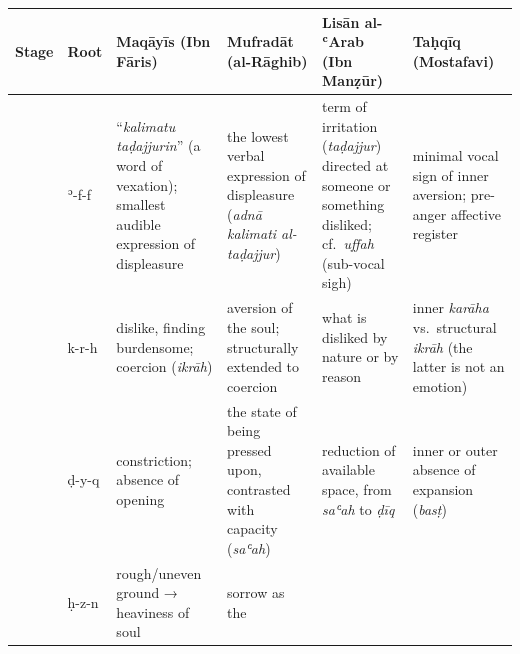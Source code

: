 \begin{longtable}[]{@{}
  >{\centering\arraybackslash}p{}
  >{\centering\arraybackslash}p{}
  >{\raggedright\arraybackslash}p{}
  >{\raggedright\arraybackslash}p{}
  >{\raggedright\arraybackslash}p{}
  >{\raggedright\arraybackslash}p{}@{}}
\toprule\noalign{}
\begin{minipage}[b]{\linewidth}\centering
Stage
\end{minipage} & \begin{minipage}[b]{\linewidth}\centering
Root
\end{minipage} & \begin{minipage}[b]{\linewidth}\raggedright
Maqāyīs (Ibn Fāris)
\end{minipage} & \begin{minipage}[b]{\linewidth}\raggedright
Mufradāt (al-Rāghib)
\end{minipage} & \begin{minipage}[b]{\linewidth}\raggedright
Lisān al-ʿArab (Ibn Manẓūr)
\end{minipage} & \begin{minipage}[b]{\linewidth}\raggedright
Taḥqīq (Mostafavi)
\end{minipage} \\
\midrule\noalign{}
\endhead
\bottomrule\noalign{}
\endlastfoot
1 & ʾ-f-f & ``\emph{kalimatu taḍajjurin}'' (a word of vexation);
smallest audible expression of displeasure & the lowest verbal
expression of displeasure (\emph{adnā kalimati al-taḍajjur}) & term of
irritation (\emph{taḍajjur}) directed at someone or something disliked;
cf.~\emph{uffah} (sub-vocal sigh) & minimal vocal sign of inner
aversion; pre-anger affective register \\
1 & k-r-h & dislike, finding burdensome; coercion (\emph{ikrāh}) &
aversion of the soul; structurally extended to coercion & what is
disliked by nature or by reason & inner \emph{karāha} vs.~structural
\emph{ikrāh} (the latter is not an emotion) \\
2 & ḍ-y-q & constriction; absence of opening & the state of being
pressed upon, contrasted with capacity (\emph{saʿah}) & reduction of
available space, from \emph{saʿah} to \emph{ḍīq} & inner or outer
absence of expansion (\emph{basṭ}) \\
2 & ḥ-z-n & rough/uneven ground → heaviness of soul & sorrow as the

\end{longtable}
